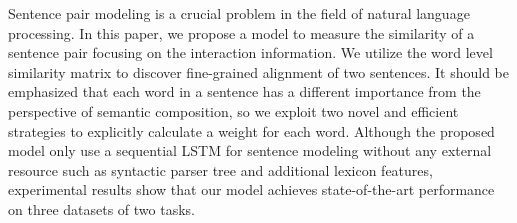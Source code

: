 Sentence pair modeling is a crucial problem in the field of natural language processing. In this paper, we propose a model to measure the similarity of a sentence pair focusing on the interaction information. We utilize the word level similarity matrix to discover fine-grained alignment of two sentences. It should be emphasized that each word in a sentence has a different importance from the perspective of semantic composition, so we exploit two novel and efficient strategies to explicitly calculate a weight for each word. Although the proposed model only use a sequential LSTM for sentence modeling without any external resource such as syntactic parser tree and additional lexicon features, experimental results show that our model achieves state-of-the-art performance on three datasets of two tasks.
